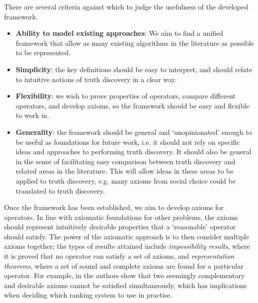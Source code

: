\documentclass[../main.tex]{subfiles}
\begin{document}
There are several criteria against which to judge the usefulness of the
developed framework.
\begin{itemize}

\item \textbf{Ability to model existing approaches}: We aim to find a unified
framework that allow as many existing algorithms in the literature as possible
to be represented.

\item \textbf{Simplicity}: the key definitions should be easy to interpret, and
should relate to intuitive notions of truth discovery in a clear way.

\item \textbf{Flexibility}: we wish to prove properties of operators, compare
different operators, and develop axioms, so the framework should be easy and
flexible to work in.

\item \textbf{Generality}: the framework should be general and `unopinionated'
enough to be useful as foundations for future work, i.e. it should not rely on
specific ideas and approaches to performing truth discovery. It should also be
general in the sense of facilitating easy comparison between truth discovery
and related areas in the literature. This will allow ideas in these areas to be
applied to truth discovery, e.g. many axioms from social choice could be
translated to truth discovery.

\end{itemize}

Once the framework has been established, we aim to develop axioms for
operators. In line with axiomatic foundations for other problems, the axioms
should represent intuitively desirable properties that a `reasonable' operator
should satisfy. The power of the axiomatic approach is to then consider
multiple axioms together; the types of results attained include
\emph{impossibility results}, where it is proved that no operator\footnotemark
can satisfy a set of axioms, and \emph{representation theorems}, where a set of
sound and complete axioms are found for a particular operator. For example, in
\cite{altman_foundations} the authors show that two seemingly complementary and
desirable axioms cannot be satisfied simultaneously, which has implications
when deciding which ranking system to use in practise.

\end{document}
